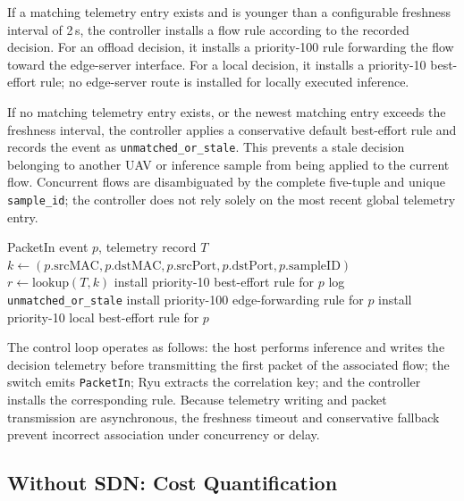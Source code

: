 \documentclass[journal]{IEEEtran}
\begin{document}
If a matching telemetry entry exists and is younger than a configurable freshness interval of 2\,s, the controller installs a flow rule according to the recorded decision. For an offload decision, it installs a priority-100 rule forwarding the flow toward the edge-server interface. For a local decision, it installs a priority-10 best-effort rule; no edge-server route is installed for locally executed inference.

If no matching telemetry entry exists, or the newest matching entry exceeds the freshness interval, the controller applies a conservative default best-effort rule and records the event as \texttt{unmatched\_or\_stale}. This prevents a stale decision belonging to another UAV or inference sample from being applied to the current flow. Concurrent flows are disambiguated by the complete five-tuple and unique \texttt{sample\_id}; the controller does not rely solely on the most recent global telemetry entry.

\begin{algorithm}[t]
\caption{Telemetry-aware SDN flow association}
\label{alg:sdn}
\begin{algorithmic}[1]
\REQUIRE PacketIn event $p$, telemetry record $T$
\STATE $k \gets (p.\mathrm{srcMAC},p.\mathrm{dstMAC},p.\mathrm{srcPort},p.\mathrm{dstPort},p.\mathrm{sampleID})$
\STATE $r \gets \mathrm{lookup}(T,k)$
\STATE install priority-10 best-effort rule for $p$
\STATE log \texttt{unmatched\_or\_stale}
\ELSE
{}
\STATE install priority-100 edge-forwarding rule for $p$
\ELSE
\STATE install priority-10 local best-effort rule for $p$
\ENDIF
\ENDIF
\end{algorithmic}
\end{algorithm}

The control loop operates as follows: the host performs inference and writes the decision telemetry before transmitting the first packet of the associated flow; the switch emits \texttt{PacketIn}; Ryu extracts the correlation key; and the controller installs the corresponding rule. Because telemetry writing and packet transmission are asynchronous, the freshness timeout and conservative fallback prevent incorrect association under concurrency or delay.

\subsection{Without SDN: Cost Quantification}
\label{sec:nosdn}
\end{document}
